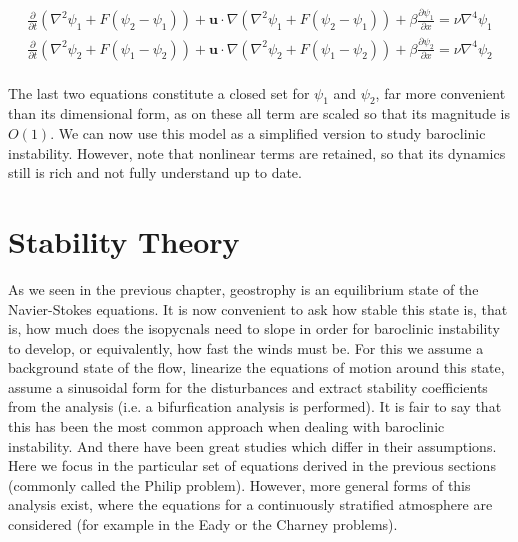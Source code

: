 \begin{eqnarray}
\frac{\partial}{\partial t} \left(\nabla^2 \psi_1 + F(\psi_2-\psi_1)\right)+\textbf{u} \cdot \nabla \left(\nabla^2 \psi_1 + F(\psi_2-\psi_1)\right)+\beta \frac{\partial \psi_1}{\partial x} = \nu \nabla^4 \psi_1 \nonumber \\
\frac{\partial}{\partial t} \left(\nabla^2 \psi_2 + F(\psi_1-\psi_2)\right)+\textbf{u} \cdot \nabla \left(\nabla^2 \psi_2 + F(\psi_1-\psi_2)\right)+\beta \frac{\partial \psi_2}{\partial x} =\nu \nabla^4 \psi_2 \nonumber \\
 \label{LEND3}
\end{eqnarray}

The last two equations constitute a closed set for $\psi_1$ and $\psi_2$, far more convenient than its dimensional form, as on these all term are scaled so that its magnitude is $O(1)$. We can now use this model as a simplified version to study baroclinic instability. However, note that nonlinear terms are retained, so that its dynamics still is rich and not fully understand up to date.

\section{Stability Theory}
\label{s:stability}
As we seen in the previous chapter, geostrophy is an equilibrium state of the Navier-Stokes equations. It is now convenient to ask how stable this state is, that is, how much does the isopycnals need to slope in order for baroclinic instability to develop, or equivalently, how fast the winds must be. For this we assume a background state of the flow, linearize the equations of motion around this state, assume a sinusoidal form for the disturbances and extract stability coefficients from the analysis (i.e. a bifurfication analysis is performed). It is fair to say that this has been the most common approach when dealing with baroclinic instability. And there have been great studies which differ in their assumptions. Here we focus in the particular set of equations derived in the previous sections (commonly called the Philip problem). However, more general forms of this analysis exist, where the equations for a continuously stratified atmosphere are considered (for example in the Eady or the Charney problems).

